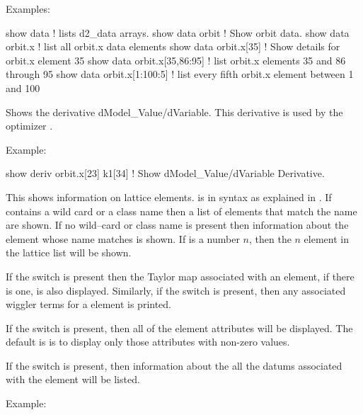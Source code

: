 {{{{\begin{description}
Examples:
\begin{example}
  show data                   ! lists d2_data arrays.
  show data orbit             ! Show orbit data.
  show data orbit.x           ! list all orbit.x data elements
  show data orbit.x[35]       ! Show details for orbit.x element 35
  show data orbit.x[35,86:95] ! list orbit.x elements 35 and 86 through 95
  show data orbit.x[1:100:5]  ! list every fifth orbit.x element between 1 and 100  
\end{example}


  \item[show derivative <data\_name(s)> <var\_name(s)>] \Newline
Shows the derivative dModel\_Value/dVariable. This derivative is used
by the optimizer .

Example:
\begin{example}
  show deriv orbit.x[23] k1[34] ! Show dModel_Value/dVariable Derivative.
\end{example}


  \item[show element \{-taylor\} \{-wig\_terms\} \{-data\} 
                     \{-all\_attributes\} <name>] \Newline
This shows information on lattice elements.  is in
 syntax as explained in . If
 contains a wild card or a class name then a list of
elements that match the name are shown. If no wild--card or class name
is present then information about the element whose name matches
 is shown. If  is a number $n$, then the $n$\Th
element in the lattice list will be shown.

If the  switch is present then the Taylor map associated
with an element, if there is one, is also displayed.  Similarly, if the
 switch is present, then any associated wiggler terms for
a   element is printed.

If the  switch is present, then all of the element attributes
will be displayed. The default is is to display only those attributes
with non-zero values.

If the  switch is present, then information about the 
all the datums associated with the element will be listed. 

Example:


\end{description}}}}}
